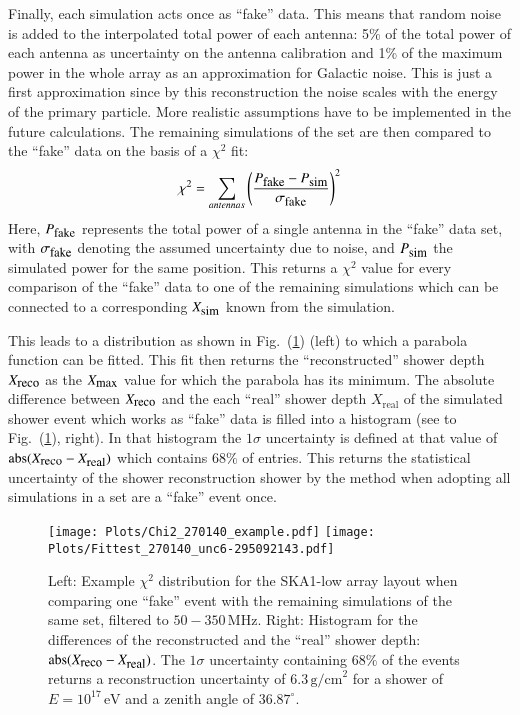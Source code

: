 \documentclass[epj]{webofc}
\newcommand*{\figref}[1]{Fig.~(\ref{fig:#1})}
\newcommand*{\figlab}[1]{\label{fig:#1}}
\begin{document}
Finally, each simulation acts once as ``fake'' data. This means that random noise is added to the interpolated total power of each antenna: 
5\% of the total power of each antenna as uncertainty on the antenna calibration and 1\% of the maximum power in the whole array as an approximation for Galactic noise.
This is just a first approximation since by this reconstruction the noise scales with the energy of the primary particle. More realistic assumptions have to be implemented in the future calculations.
The remaining simulations of the set are then compared to the ``fake'' data  on the basis of a  $\chi^2$ fit:
\begin{equation}
 \chi^2 =  \sum_{antennas} \left(\frac{P_{\mbox{\small fake}} - P_{\mbox{\small sim}}}{\sigma_{\mbox{\small fake}}}\right)^2
\end{equation}
Here, $P_{\mbox{\small fake}}$ represents the total power of a single antenna in the ``fake'' data set, with $\sigma_{\mbox{\small fake}}$ denoting the assumed uncertainty due to noise, and $P_{\mbox{\small sim}}$ the simulated power for the same position. This returns a $\chi^2$ value for every comparison of the ``fake'' data to one of the remaining simulations which can be connected to a corresponding $X_{\mbox{\small sim}}$ known from the simulation.

This leads to a distribution as shown in \figref{fig-2} (left) to which a parabola function can be fitted. This fit then returns the ``reconstructed'' shower depth $X_{\mbox{\small reco}}$ as the $X_{\mbox{\small max}}$ value for which the parabola has its minimum. The absolute difference between $X_{\mbox{\small reco}}$ and the each ``real'' shower depth $X_{\mbox{real}}$ of the simulated shower event which works as ``fake'' data  is filled into a histogram (see to \figref{fig-2}, right). In that histogram the $1\sigma$ uncertainty is defined at that value of $\mbox{abs}(X_{\mbox{\small reco}}-X_{\mbox{\small real}})$ which contains $68\%$ of entries. This returns the statistical uncertainty of the shower reconstruction shower by the method when adopting all simulations in a set are a ``fake'' event once.\\
%
\begin{figure}[tb]
\centering
\texttt{[image: Plots/Chi2\_270140\_example.pdf]}
\hspace{0.3cm}
\texttt{[image: Plots/Fittest\_270140\_unc6-295092143.pdf]}
\caption{Left: Example $\chi^2$ distribution for the SKA1-low array layout when comparing one ``fake'' event with the remaining simulations of the same set, filtered to $50-350\,\mbox{MHz}$. Right: Histogram for the differences of the reconstructed and the ``real'' shower depth: $\mbox{abs}(X_{\mbox{\small reco}}-X_{\mbox{\small real}})$. The $1\sigma$ uncertainty containing $68\%$ of the events returns a reconstruction uncertainty of $6.3\,\mbox{g/cm}^2$ for a shower of $E=10^{17}\,\mbox{eV}$ and  a zenith angle of $36.87^\circ$.}
\figlab{fig-2}       %
\end{figure}
%
\vspace{-0.5cm}
\end{document}

